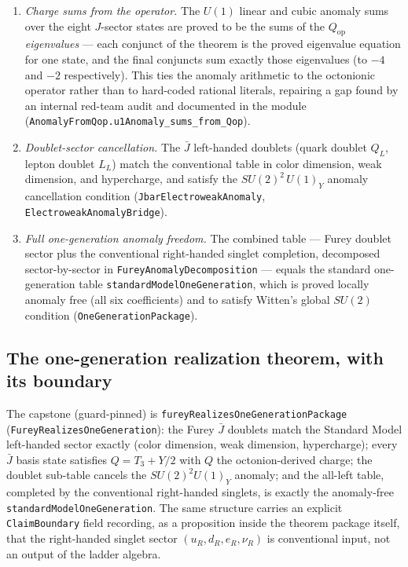 \documentclass[11pt]{article}
\newcommand{\leanname}[1]{\texttt{#1}}
\begin{document}
\begin{enumerate}[leftmargin=2em]
\item \emph{Charge sums from the operator.}  The $U(1)$ linear and cubic
  anomaly sums over the eight $J$-sector states are proved to be the sums
  of the $Q_{\mathrm{op}}$ \emph{eigenvalues} --- each conjunct of the
  theorem is the proved eigenvalue equation for one state, and the final
  conjuncts sum exactly those eigenvalues (to $-4$ and $-2$
  respectively).  This ties the anomaly arithmetic to the octonionic
  operator rather than to hard-coded rational literals, repairing a gap
  found by an internal red-team audit and documented in the module
  (\leanname{AnomalyFromQop.u1Anomaly\_sums\_from\_Qop}).
\item \emph{Doublet-sector cancellation.}  The $\bar J$ left-handed
  doublets (quark doublet $Q_L$, lepton doublet $L_L$) match the
  conventional table in color dimension, weak dimension, and
  hypercharge, and satisfy the $SU(2)^2\,U(1)_Y$ anomaly cancellation
  condition (\leanname{JbarElectroweakAnomaly},
  \leanname{ElectroweakAnomalyBridge}).
\item \emph{Full one-generation anomaly freedom.}  The combined table ---
  Furey doublet sector plus the conventional right-handed singlet
  completion, decomposed sector-by-sector in
  \leanname{FureyAnomalyDecomposition} --- equals the standard
  one-generation table \leanname{standardModelOneGeneration}, which is
  proved locally anomaly free (all six coefficients) and to satisfy
  Witten's global $SU(2)$ condition
  (\leanname{OneGenerationPackage}).
\end{enumerate}

\subsection{The one-generation realization theorem, with its boundary}

The capstone (guard-pinned) is
\leanname{fureyRealizesOneGenerationPackage}
(\leanname{FureyRealizesOneGeneration}): the Furey $\bar J$ doublets
match the Standard Model left-handed sector exactly (color dimension,
weak dimension, hypercharge); every $\bar J$ basis state satisfies
$Q = T_3 + Y/2$ with $Q$ the octonion-derived charge; the doublet
sub-table cancels the $SU(2)^2 U(1)_Y$ anomaly; and the all-left table,
completed by the conventional right-handed singlets, is exactly the
anomaly-free \leanname{standardModelOneGeneration}.  The same structure
carries an explicit \leanname{ClaimBoundary} field recording, as a
proposition inside the theorem package itself, that the right-handed
singlet sector $(u_R, d_R, e_R, \nu_R)$ is conventional input, not an
output of the ladder algebra.
\end{document}

